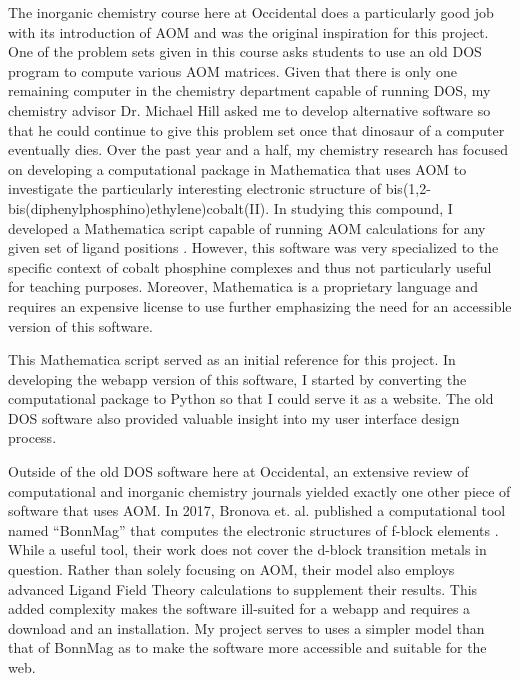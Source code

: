 \documentclass[10pt,twocolumn]{article}
\begin{document}
The inorganic chemistry course here at Occidental does a particularly good job with its introduction of AOM and was the original inspiration for this project. One of the problem sets given in this course asks students to use an old DOS program to compute various AOM matrices. Given that there is only one remaining computer in the chemistry department capable of running DOS, my chemistry advisor Dr. Michael Hill asked me to develop alternative software so that he could continue to give this problem set once that dinosaur of a computer eventually dies. Over the past year and a half, my chemistry research has focused on developing a computational package in Mathematica that uses AOM to investigate the particularly interesting electronic structure of bis(1,2-bis(diphenylphosphino)ethylene)cobalt(II). In studying this compound, I developed a Mathematica script capable of running AOM calculations for any given set of ligand positions \cite{thomascolwell2022}. However, this software was very specialized to the specific context of cobalt phosphine complexes and thus not particularly useful for teaching purposes. Moreover, Mathematica is a proprietary language and requires an expensive license to use further emphasizing the need for an accessible version of this software. 

This Mathematica script served as an initial reference for this project. In developing the webapp version of this software, I started by converting the computational package to Python so that I could serve it as a website. The old DOS software also provided valuable insight into my user interface design process. 

Outside of the old DOS software here at Occidental, an extensive review of computational and inorganic chemistry journals yielded exactly one other piece of software that uses AOM. In 2017, Bronova et. al. published a computational tool named ``BonnMag'' that computes the electronic structures of f-block elements \cite{bronova2018}. While a useful tool, their work does not cover the d-block transition metals in question. Rather than solely focusing on AOM, their model also employs advanced Ligand Field Theory calculations to supplement their results. This added complexity makes the software ill-suited for a webapp and requires a download and an installation. My project serves to uses a simpler model than that of BonnMag as to make the software more accessible and suitable for the web.
\end{document}
